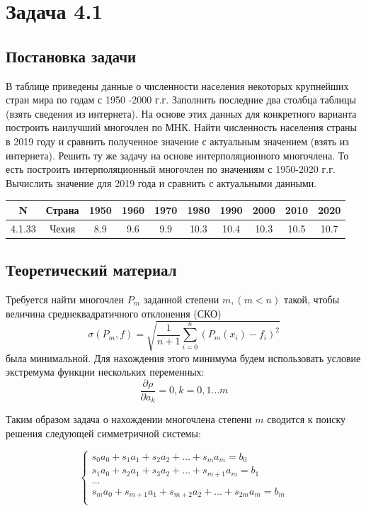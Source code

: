 \section*{Задача 4.1}
\subsection*{Постановка задачи}
В таблице приведены данные о численности населения некоторых
крупнейших стран мира по годам с 1950 -2000 г.г. Заполнить последние два столбца
таблицы (взять сведения из интернета). На основе этих данных для конкретного варианта
построить наилучший многочлен по МНК. Найти численность населения страны в 2019
году и сравнить полученное значение с актуальным значением (взять из интернета).
Решить ту же задачу на основе интерполяционного многочлена. То есть построить
интерполяционный многочлен по значениям с 1950-2020 г.г. Вычислить значение для
2019 года и сравнить с актуальными данными.

\begin{tabular}{| c | c | c | c | c | c | c | c | c | c |}
	\hline
	N & Страна & 1950 & 1960 & 1970 & 1980 & 1990 & 2000 & 2010 & 2020 \\ \hline
	4.1.33 & Чехия & 8.9 & 9.6 & 9.9 & 10.3 & 10.4 & 10.3 & 10.5 & 10.7 \\ \hline
\end{tabular}

\subsection*{Теоретический материал}

Требуется найти многочлен $P_m$ заданной степени $m, (m < n)$ такой, чтобы величина
среднеквадратичного отклонения (СКО)
\[
	\sigma(P_m, f) = \sqrt{\dfrac{1}{n + 1}\sum\limits_{i=0}^n(P_m(x_i) - f_i)^2}
\]
была минимальной. Для нахождения этого минимума будем использовать условие экстремума функции нескольких переменных:
\[
	\dfrac{\partial \rho}{\partial a_k} = 0, k = 0,1 \dots m
\]

Таким образом задача о нахождении многочлена  степени $m$ сводится к поиску решения следующей симметричной системы:

\[
	\begin{cases}
		s_0a_0 + s_1a_1 + s_2a_2 + \dots + s_ma_m = b_0 \\
		s_1a_0 + s_2a_1 + s_3a_2 + \dots + s_{m+1}a_m = b_1 \\
		\dots \\
		s_ma_0 + s_{m+1}a_1 + s_{m+2}a_2 + \dots + s_{2m}a_m = b_m \\
	\end{cases}
\]

